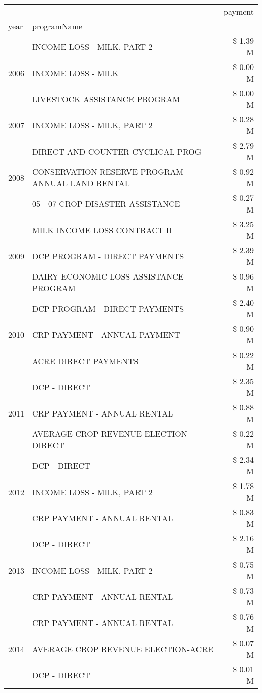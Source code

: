 \begin{tabular}{llr}
\toprule
 &  & payment \\
year & programName &  \\
\midrule
\multirow[t]{3}{*}{2006} & INCOME LOSS - MILK, PART 2 & \$ 1.39 M \\
 & INCOME LOSS - MILK & \$ 0.00 M \\
 & LIVESTOCK ASSISTANCE PROGRAM & \$ 0.00 M \\
\cline{1-3}
2007 & INCOME LOSS - MILK, PART 2 & \$ 0.28 M \\
\cline{1-3}
\multirow[t]{3}{*}{2008} & DIRECT AND COUNTER CYCLICAL PROG & \$ 2.79 M \\
 & CONSERVATION RESERVE PROGRAM - ANNUAL LAND RENTAL & \$ 0.92 M \\
 & 05 - 07 CROP DISASTER ASSISTANCE & \$ 0.27 M \\
\cline{1-3}
\multirow[t]{3}{*}{2009} & MILK INCOME LOSS CONTRACT II & \$ 3.25 M \\
 & DCP PROGRAM - DIRECT PAYMENTS & \$ 2.39 M \\
 & DAIRY ECONOMIC LOSS ASSISTANCE PROGRAM & \$ 0.96 M \\
\cline{1-3}
\multirow[t]{3}{*}{2010} & DCP PROGRAM - DIRECT PAYMENTS & \$ 2.40 M \\
 & CRP PAYMENT - ANNUAL PAYMENT & \$ 0.90 M \\
 & ACRE DIRECT PAYMENTS & \$ 0.22 M \\
\cline{1-3}
\multirow[t]{3}{*}{2011} & DCP - DIRECT & \$ 2.35 M \\
 & CRP PAYMENT - ANNUAL RENTAL & \$ 0.88 M \\
 & AVERAGE CROP REVENUE ELECTION-DIRECT & \$ 0.22 M \\
\cline{1-3}
\multirow[t]{3}{*}{2012} & DCP - DIRECT & \$ 2.34 M \\
 & INCOME LOSS - MILK, PART 2 & \$ 1.78 M \\
 & CRP PAYMENT - ANNUAL RENTAL & \$ 0.83 M \\
\cline{1-3}
\multirow[t]{3}{*}{2013} & DCP - DIRECT & \$ 2.16 M \\
 & INCOME LOSS - MILK, PART 2 & \$ 0.75 M \\
 & CRP PAYMENT - ANNUAL RENTAL & \$ 0.73 M \\
\cline{1-3}
\multirow[t]{3}{*}{2014} & CRP PAYMENT - ANNUAL RENTAL & \$ 0.76 M \\
 & AVERAGE CROP REVENUE ELECTION-ACRE & \$ 0.07 M \\
 & DCP - DIRECT & \$ 0.01 M \\

\end{tabular}
